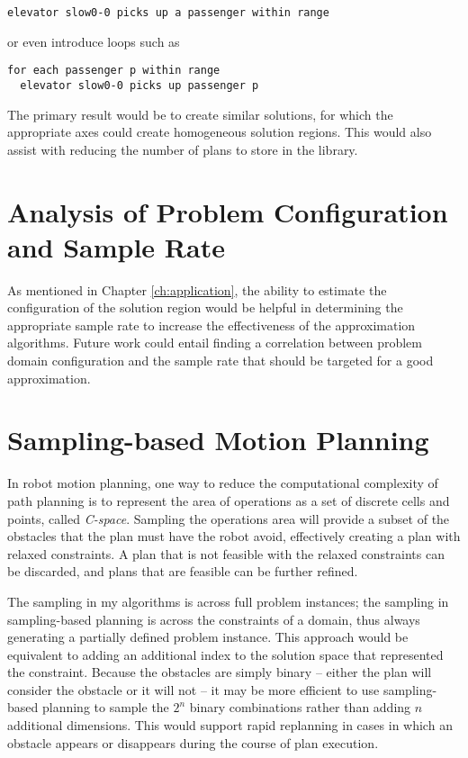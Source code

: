 \begin{verbatim}
elevator slow0-0 picks up a passenger within range
\end{verbatim}

\noindent
or even introduce loops such as

\begin{verbatim}
for each passenger p within range
  elevator slow0-0 picks up passenger p
\end{verbatim}

The primary result would be to create similar solutions, for which the appropriate axes could create homogeneous solution regions.  This would also assist with reducing the number of plans to store in the library.

\section{Analysis of Problem Configuration and Sample Rate}
As mentioned in Chapter \ref{ch:application}, the ability to estimate the configuration of the solution region would be helpful in determining the appropriate sample rate to increase the effectiveness of the approximation algorithms.  Future work could entail finding a correlation between problem domain configuration and the sample rate that should be targeted for a good approximation.

\section{Sampling-based Motion Planning}

In robot motion planning, one way to reduce the computational complexity of path planning is to represent the area of operations as a set of discrete cells and points, called \textit{C-space}.  Sampling the operations area will provide a subset of the obstacles that the plan must have the robot avoid, effectively creating a plan with relaxed constraints.  A plan that is not feasible with the relaxed constraints can be discarded, and plans that are feasible can be further refined.  

The sampling in my algorithms is across full problem instances; the sampling in sampling-based planning is across the constraints of a domain, thus always generating a partially defined problem instance.  This approach would be equivalent to adding an additional index to the solution space that represented the constraint.  Because the obstacles are simply binary -- either the plan will consider the obstacle or it will not -- it may be more efficient to use sampling-based planning to sample the $2^n$ binary combinations rather than adding $n$ additional dimensions.  This would support rapid replanning in cases in which an obstacle appears or disappears during the course of plan execution.

